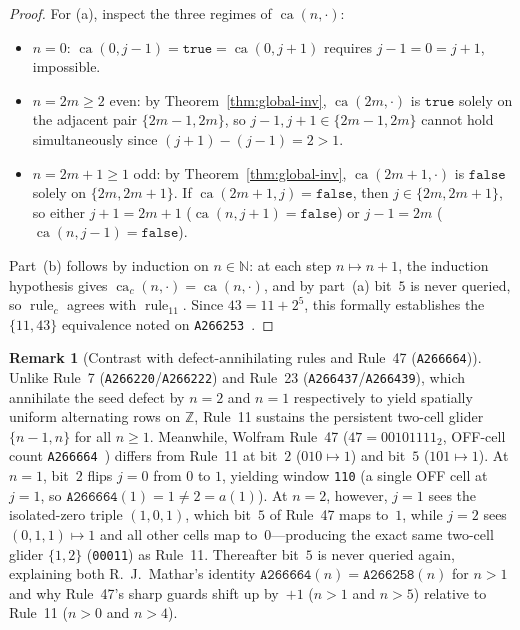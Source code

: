\documentclass[11pt]{article}
\theoremstyle{definition}
\newtheorem{remark}[theorem]{Remark}
\newcommand{\N}{\mathbb{N}}
\newcommand{\Z}{\mathbb{Z}}
\newcommand{\seq}[1]{\texttt{#1}}
\newcommand{\ruleTT}{\operatorname{rule}_{11}}
\newcommand{\ca}{\operatorname{ca}}
\begin{document}
\begin{proof}
For (a), inspect the three regimes of $\ca(n, \cdot)$:
\begin{itemize}
\item $n = 0$: $\ca(0, j - 1) = \mathtt{true} = \ca(0, j + 1)$ requires $j - 1 = 0 = j + 1$, impossible.
\item $n = 2m \ge 2$ even: by Theorem~\ref{thm:global-inv}, $\ca(2m, \cdot)$ is $\mathtt{true}$ solely on the adjacent pair $\{2m - 1, 2m\}$, so $j - 1, j + 1 \in \{2m - 1, 2m\}$ cannot hold simultaneously since $(j + 1) - (j - 1) = 2 > 1$.
\item $n = 2m + 1 \ge 1$ odd: by Theorem~\ref{thm:global-inv}, $\ca(2m + 1, \cdot)$ is $\mathtt{false}$ solely on $\{2m, 2m + 1\}$. If $\ca(2m + 1, j) = \mathtt{false}$, then $j \in \{2m, 2m + 1\}$, so either $j + 1 = 2m + 1$ ($\ca(n, j + 1) = \mathtt{false}$) or $j - 1 = 2m$ ($\ca(n, j - 1) = \mathtt{false}$).
\end{itemize}
Part~(b) follows by induction on $n \in \N$: at each step $n \mapsto n + 1$, the induction hypothesis gives $\ca_c(n, \cdot) = \ca(n, \cdot)$, and by part~(a) bit~$5$ is never queried, so $\operatorname{rule}_c$ agrees with $\ruleTT$. Since $43 = 11 + 2^5$, this formally establishes the $\{11, 43\}$ equivalence noted on \seq{A266253}~\cite{oeis266253}.
\end{proof}

\begin{remark}[Contrast with defect-annihilating rules and Rule~47 (\seq{A266664})]
\label{rem:rule47}
Unlike Rule~7 (\seq{A266220}/\seq{A266222}) and Rule~23 (\seq{A266437}/\seq{A266439}), which annihilate the seed defect by $n = 2$ and $n = 1$ respectively to yield spatially uniform alternating rows on $\Z$, Rule~11 sustains the persistent two-cell glider $\{n - 1, n\}$ for all $n \ge 1$. Meanwhile, Wolfram Rule~47 ($47 = 00101111_2$, OFF-cell count \seq{A266664}~\cite{oeis266664}) differs from Rule~11 at bit~$2$ ($010 \mapsto 1$) and bit~$5$ ($101 \mapsto 1$). At $n = 1$, bit~$2$ flips $j = 0$ from $0$ to $1$, yielding window \texttt{110} (a single OFF cell at $j = 1$, so $\seq{A266664}(1) = 1 \ne 2 = a(1)$). At $n = 2$, however, $j = 1$ sees the isolated-zero triple $(1, 0, 1)$, which bit~$5$ of Rule~47 maps to~$1$, while $j = 2$ sees $(0, 1, 1) \mapsto 1$ and all other cells map to~$0$---producing the exact same two-cell glider $\{1, 2\}$ (\texttt{00011}) as Rule~11. Thereafter bit~$5$ is never queried again, explaining both R.~J.\ Mathar's identity $\seq{A266664}(n) = \seq{A266258}(n)$ for $n > 1$ and why Rule~47's sharp guards shift up by~$+1$ ($n > 1$ and $n > 5$) relative to Rule~11 ($n > 0$ and $n > 4$).
\end{remark}
\end{document}
